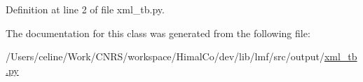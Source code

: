 Definition at line 2 of file xml\+\_\+tb.\+py.



The documentation for this class was generated from the following file\+:\begin{DoxyCompactItemize}
\item 
/\+Users/celine/\+Work/\+C\+N\+R\+S/workspace/\+Himal\+Co/dev/lib/lmf/src/output/\hyperlink{xml__tb_8py}{xml\+\_\+tb.\+py}\end{DoxyCompactItemize}
